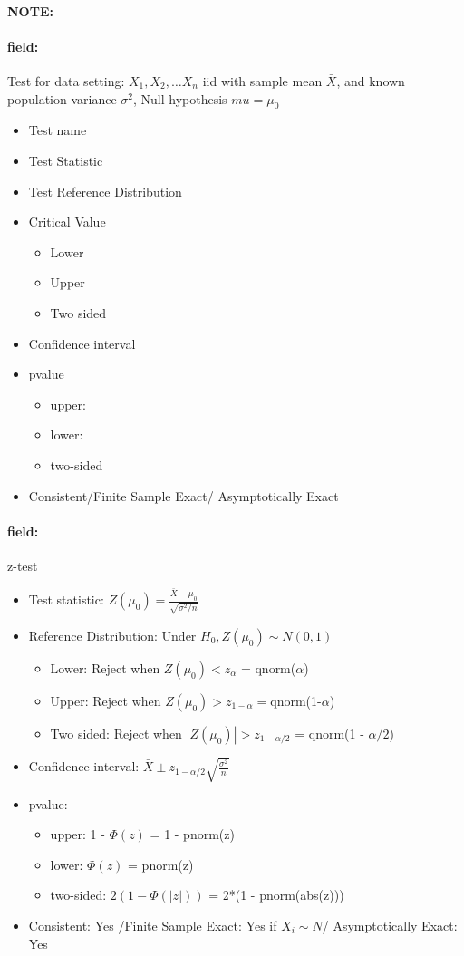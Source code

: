\documentclass[12pt]{article}
\newenvironment{note}{\paragraph{NOTE:}}{}
\newenvironment{field}{\paragraph{field:}}{}
\begin{document}
\begin{note}
	\begin{field}
		Test for data setting: $X_1, X_2, \ldots X_n$ iid with sample mean $\bar{X}$, and known population variance $\sigma^2$, Null hypothesis $mu = \mu_0$

		\begin{itemize}
			\item Test name
			\item Test Statistic
			\item Test Reference Distribution
			\item Critical Value
      \begin{itemize}
        \item Lower
        \item Upper
        \item Two sided
      \end{itemize}
			\item Confidence interval
			\item pvalue
			      \begin{itemize}
				      \item upper:
				      \item lower:
				      \item two-sided
			      \end{itemize}
			\item Consistent/Finite Sample Exact/ Asymptotically Exact
		\end{itemize}
	\end{field}
	\begin{field}
		z-test
		\begin{itemize}
			\item Test statistic: $Z(\mu_0) = \frac{\bar{X} - \mu_0}{\sqrt{\sigma^2/n}}$
			\item Reference Distribution: Under $H_0, Z(\mu_0) \sim N(0,1)$
      \begin{itemize}
        \item Lower: Reject when $Z(\mu_0) < z_{\alpha}$ = qnorm($\alpha$)
        \item Upper: Reject when $Z(\mu_0) > z_{1 - \alpha} = $qnorm(1-$\alpha$)
        \item Two sided:  Reject when $|Z(\mu_0)| > z_{1 - \alpha/2}$ = qnorm(1 - $\alpha/2$)
      \end{itemize}
			\item Confidence interval: $ \bar{X} \pm z_{1 - \alpha/2}\sqrt{\frac{\sigma^2}{n}}$
			\item pvalue:
			      \begin{itemize}
				      \item upper: 1 - $\Phi(z)$ = 1 - pnorm(z)
				      \item lower: $\Phi(z)$ = pnorm(z)
				      \item two-sided: $2(1 - \Phi(|z|))$ = 2*(1 - pnorm(abs(z)))
			      \end{itemize}
			\item Consistent: Yes /Finite Sample Exact: Yes if $X_i \sim N$/ Asymptotically Exact: Yes
		\end{itemize}
	\end{field}
\end{note}
\end{document}
